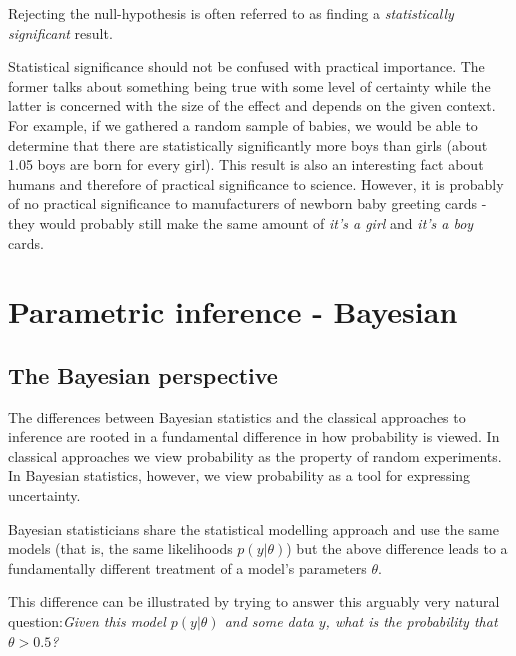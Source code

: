 \documentclass{book}
\theoremstyle{plain}%
\theoremstyle{definition}
\begin{document}
Rejecting the null-hypothesis is often referred to as finding a \emph{statistically significant} result. 

Statistical significance should not be confused with practical importance. The former talks about something being true with some level of certainty while the latter is concerned with the size of the effect and depends on the given context. For example, if we gathered a random sample of babies, we would be able to determine that there are statistically significantly more boys than girls (about 1.05 boys are born for every girl). This result is also an interesting fact about humans and therefore of practical significance to science. However, it is probably of no practical significance to manufacturers of newborn baby greeting cards - they would probably still make the same amount of \emph{it's a girl} and \emph{it's a boy} cards.



\chapter{Parametric inference - Bayesian}\label{ch:bayes}

\section{The Bayesian perspective}

The differences between Bayesian statistics and the classical approaches to inference are rooted in a fundamental difference in how probability is viewed. In classical approaches we view probability as the property of random experiments. In Bayesian statistics, however, we view probability as a tool for expressing uncertainty. 

Bayesian statisticians share the statistical modelling approach and use the same models (that is, the same likelihoods $p(y|\theta)$) but the above difference leads to a fundamentally different treatment of a model's parameters $\theta$.

This difference can be illustrated by trying to answer this arguably very natural question:\emph{Given this model $p(y|\theta)$ and some data $y$, what is the probability that $\theta > 0.5$?} 
\end{document}
